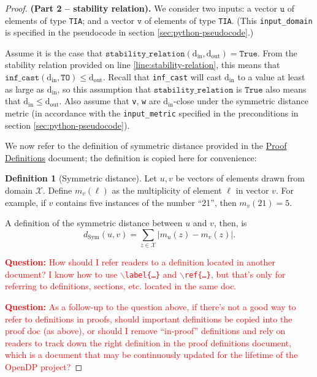 \documentclass[12pt,letterpaper]{article}
\newcommand{\din}{\mathrm{d_{in}}}
\newcommand{\dout}{\mathrm{d_{out}}}
\newcommand{\question}[1]{\textcolor{red}{\textbf{Question:} #1}}
\newcommand{\True}{\texttt{True}}
\theoremstyle{definition}
\newtheorem{definition}{Definition}[section]
\begin{document}
\begin{proof} \textbf{(Part 2 -- stability relation).} We consider two inputs: a vector $\texttt{u}$ of elements of type \texttt{TIA}; and a vector $\texttt{v}$ of elements of type \texttt{TIA}. (This \texttt{input\_domain} is specified in the pseudocode in section \ref{sec:python-pseudocode}.)

Assume it is the case that $\texttt{stability\_relation}(\din, \dout) = \True$. From  the stability relation provided on line \ref{line:stability-relation}, this means that $\texttt{inf\_cast}(\din, \texttt{TO}) \leq \dout$. Recall that \texttt{inf\_cast} will cast $\din$ to a value at least as large as $\din$, so this assumption that $\texttt{stability\_relation}$ is $\True$ also means that $\din \leq \dout$. Also assume that \texttt{v}, \texttt{w} are $\din$-close under the symmetric distance metric (in accordance with the \texttt{input\_metric} specified in the preconditions in section \ref{sec:python-pseudocode}).

We now refer to the definition of symmetric distance provided in the \href{https://www.overleaf.com/project/60d214e390b337703d200982}{Proof Definitions} document; the definition is copied here for convenience:

\begin{definition}[Symmetric distance]
\label{defn:symm-dist}
Let $u,v$ be vectors of elements drawn from domain $\mathcal{X}$. Define $m_v(\ell)$ as the multiplicity of element $\ell$ in vector $v$. For example, if $v$ contains five instances of the number ``21'', then $m_v(21) = 5$.

A definition of the symmetric distance between $u$ and $v$, then, is $$d_{\text{Sym}}(u,v) = \sum_{z\in \mathcal{X}} |m_u(z) - m_v(z)|.$$
\end{definition}

\question{How should I refer readers to a definition located in another document? I know how to use \texttt{$\backslash$label\{\ldots\}} and \texttt{$\backslash$ref\{\ldots\}}, but that's only for referring to definitions, sections, etc. located in the same doc.}

\question{As a follow-up to the question above, if there's not a good way to refer to definitions in proofs, should important definitions be copied into the proof doc (as above), or should I remove ``in-proof'' definitions and rely on readers to track down the right definition in the proof definitions document, which is a document that may be continuously updated for the lifetime of the OpenDP project?}


\end{proof}
\end{document}

